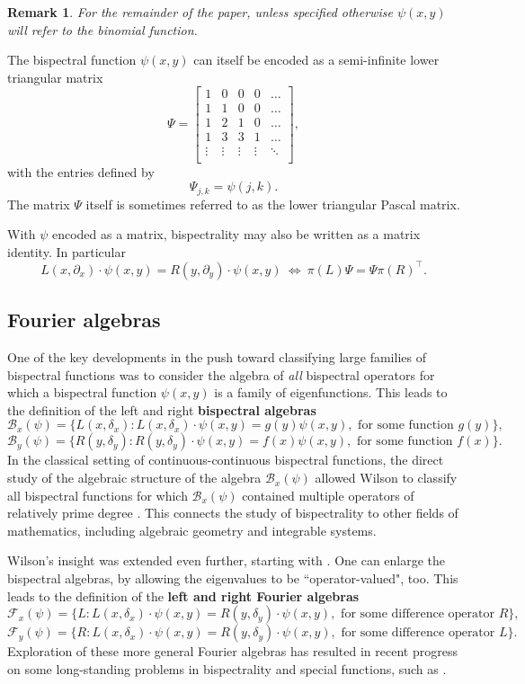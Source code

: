 \documentclass[11pt]{amsart}
\theoremstyle{plain}
\newtheorem{remark}[theorem]{Remark}
\theoremstyle{named}
\newcommand{\vocab}[1]{\textbf{#1}}
\begin{document}
\begin{remark}
For the remainder of the paper, unless specified otherwise $\psi(x,y)$ will refer to the binomial function.
\end{remark}

The bispectral function $\psi(x,y)$ can itself be encoded as a semi-infinite lower triangular matrix 
$$
\Psi = \left[\begin{array}{ccccc}
1 & 0 & 0  &0  & \dots \\
1 &1 & 0 & 0  &\dots \\
 1  & 2 & 1 & 0  &\dots \\
 1  & 3 & 3 & 1  &\dots \\
\vdots & \vdots & \vdots & \vdots&\ddots\\
\end{array}\right],
$$ with the entries defined by
$$\Psi_{j,k}=\psi(j,k).$$
The matrix $\Psi$ itself is sometimes referred to as the lower triangular Pascal matrix.

With $\psi$ encoded as a matrix, bispectrality may also be written as a matrix identity.
In particular
$$L(x,\partial_x)\cdot\psi(x,y) = R(y,\partial_y)\cdot\psi(x,y)\ \Leftrightarrow\ \pi(L)\Psi = \Psi \pi(R)^\intercal.$$

\subsection{Fourier algebras}
One of the key developments in the push toward classifying large families of bispectral functions was to consider the algebra of \emph{all} bispectral operators for which a bispectral function $\psi(x,y)$ is a family of eigenfunctions.
This leads to the definition of the left and right \vocab{bispectral algebras} 
$$\mathcal B_x(\psi) = \{L(x,\delta_x) : L(x,\delta_x)\cdot \psi(x,y) = g(y)\psi(x,y),  \text{ for some function } g(y) \},$$
$$\mathcal B_y(\psi) = \{R(y,\delta_y) : R(y,\delta_y)\cdot \psi(x,y) = f(x)\psi(x,y),  \text{ for some function } f(x) \}.$$
In the classical setting of continuous-continuous bispectral functions, the direct study of the algebraic structure of the algebra $\mathcal B_x(\psi)$ allowed Wilson to classify all bispectral functions for which $\mathcal B_x(\psi)$ contained multiple operators of relatively prime degree \cite{Wilson}.
This connects the study of bispectrality to other fields of mathematics, including algebraic geometry and integrable systems.

Wilson's insight was extended even further, starting with \cite{BHY1,GHY}.
One can enlarge the bispectral algebras, by allowing the eigenvalues to be ``operator-valued", too. 
This leads to the definition of the \vocab{left and right Fourier algebras}
$$\mathcal F_x(\psi) =\{L : L(x,\delta_x)\cdot \psi(x,y) =R(y,\delta_y)\cdot \psi(x,y),  \text{ for some difference operator } R \},$$
$$\mathcal F_y(\psi) =\{R : L(x,\delta_x)\cdot \psi(x,y) =R(y,\delta_y)\cdot \psi(x,y),  \text{ for some difference operator } L \}.$$
Exploration of these more general Fourier algebras has resulted in recent progress on some long-standing problems in bispectrality and special functions, such as \cite{CY1,CY2}.
\end{document}
